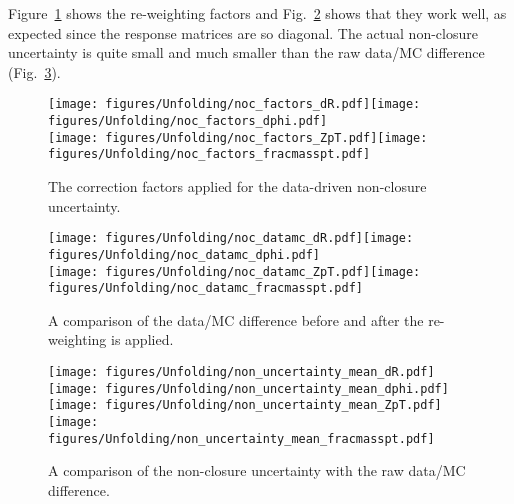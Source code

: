 Figure~\ref{fig:nonclosure1} shows the re-weighting factors and Fig.~\ref{fig:nonclosure2} shows that they work well, as expected since the response matrices are so diagonal.  The actual non-closure uncertainty is quite small and much smaller than the raw data/MC difference (Fig.~\ref{fig:nonclosure3}).

\begin{figure}[htpb!]
\begin{center}
\texttt{[image: figures/Unfolding/noc\_factors\_dR.pdf]}\texttt{[image: figures/Unfolding/noc\_factors\_dphi.pdf]}\\
\texttt{[image: figures/Unfolding/noc\_factors\_ZpT.pdf]}\texttt{[image: figures/Unfolding/noc\_factors\_fracmasspt.pdf]}
\caption[]{The correction factors applied for the data-driven non-closure uncertainty. } 
\label{fig:nonclosure1}
\end{center}
\end{figure}

\begin{figure}[htpb!]
\begin{center}
\texttt{[image: figures/Unfolding/noc\_datamc\_dR.pdf]}\texttt{[image: figures/Unfolding/noc\_datamc\_dphi.pdf]}\\
\texttt{[image: figures/Unfolding/noc\_datamc\_ZpT.pdf]}\texttt{[image: figures/Unfolding/noc\_datamc\_fracmasspt.pdf]}
\caption[]{A comparison of the data/MC difference before and after the re-weighting is applied. } 
\label{fig:nonclosure2}
\end{center}
\end{figure}

\begin{figure}[htpb!]
\begin{center}
\texttt{[image: figures/Unfolding/non\_uncertainty\_mean\_dR.pdf]}\texttt{[image: figures/Unfolding/non\_uncertainty\_mean\_dphi.pdf]}\\
\texttt{[image: figures/Unfolding/non\_uncertainty\_mean\_ZpT.pdf]}\texttt{[image: figures/Unfolding/non\_uncertainty\_mean\_fracmasspt.pdf]}
\caption[]{A comparison of the non-closure uncertainty with the raw data/MC difference. } 
\label{fig:nonclosure3}
\end{center}
\end{figure}

